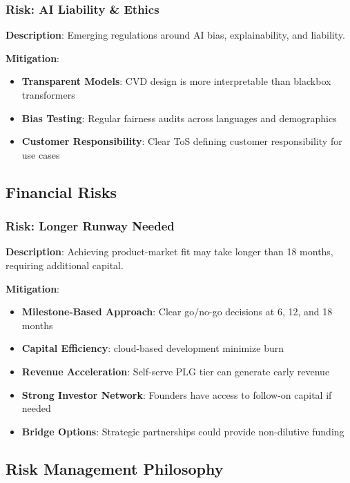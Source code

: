 \subsubsection{Risk: AI Liability \& Ethics}
\textbf{Description}: Emerging regulations around AI bias, explainability, and liability.

\textbf{Mitigation}:
\begin{itemize}
    \item \textbf{Transparent Models}: CVD design is more interpretable than blackbox transformers
    \item \textbf{Bias Testing}: Regular fairness audits across languages and demographics
    \item \textbf{Customer Responsibility}: Clear ToS defining customer responsibility for use cases
\end{itemize}

\subsection{Financial Risks}

\subsubsection{Risk: Longer Runway Needed}
\textbf{Description}: Achieving product-market fit may take longer than 18 months, requiring additional capital.

\textbf{Mitigation}:
\begin{itemize}
    \item \textbf{Milestone-Based Approach}: Clear go/no-go decisions at 6, 12, and 18 months
    \item \textbf{Capital Efficiency}: cloud-based development minimize burn
    \item \textbf{Revenue Acceleration}: Self-serve PLG tier can generate early revenue
    \item \textbf{Strong Investor Network}: Founders have access to follow-on capital if needed
    \item \textbf{Bridge Options}: Strategic partnerships could provide non-dilutive funding
\end{itemize}

\subsection{Risk Management Philosophy}

